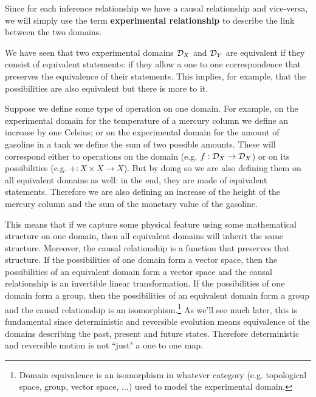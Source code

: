 \documentclass[11pt,letterpaper,fleqn]{memoir} %
\begin{document}
Since for each inference relationship we have a causal relationship and vice-versa, we will simply use the term \textbf{experimental relationship} to describe the link between the two domains.

We have seen that two experimental domains $\mathcal{D}_X$ and $\mathcal{D}_Y$ are equivalent if they consist of equivalent statements: if they allow a one to one correspondence that preserves the equivalence of their statements. This implies, for example, that the possibilities are also equivalent but there is more to it.

Suppose we define some type of operation on one domain. For example, on the experimental domain for the temperature of a mercury column we define an increase by one Celsius; or on the experimental domain for the amount of gasoline in a tank we define the sum of two possible amounts. These will correspond either to operations on the domain (e.g. $f : \mathcal{D}_X \to \mathcal{D}_X$) or on its possibilities (e.g. $+ : X \times X \to X$). But by doing so we are also defining them on all equivalent domains as well: in the end, they are made of equivalent statements. Therefore we are also defining an increase of the height of the mercury column and the sum of the monetary value of the gasoline.

This means that if we capture some physical feature using some mathematical structure on one domain, then all equivalent domains will inherit the same structure. Moreover, the causal relationship is a function that preserves that structure. If the possibilities of one domain form a vector space, then the possibilities of an equivalent domain form a vector space and the causal relationship is an invertible linear transformation. If the possibilities of one domain form a group, then the possibilities of an equivalent domain form a group and the causal relationship is an isomorphism.\footnote{Domain equivalence is an isomorphism in whatever category (e.g. topological space, group, vector space, ...) used to model the experimental domain.} As we'll see much later, this is fundamental since deterministic and reversible evolution means equivalence of the domains describing the past, present and future states. Therefore deterministic and reversible motion is not ``just" a one to one map.
\end{document}
